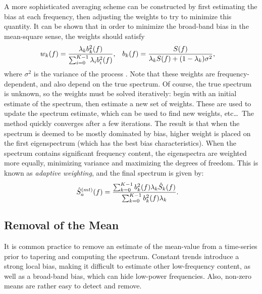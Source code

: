 A more sophisticated averaging scheme can be constructed by first estimating the bias at each frequency, then adjusting the weights to try to minimize this quantity.  It can be shown that in order to minimize the broad-band bias in the mean-square sense, the weights should satisfy
\begin{align}
    w_k(f) & = \dfrac{\lambda_k b_k^2(f)}{\sum_{i=0}^{K-1}\lambda_ib_i^2(f)}, & b_k(f) &= \dfrac{S(f)}{\lambda_kS(f)+(1-\lambda_k)\sigma^2},  \index{adaptive weights} \label{eq:adaptweights}
\end{align}
where $\sigma^2$ is the variance of the process \cite{percival:multitaper}.  Note that these weights are frequency-dependent, and also depend on the true spectrum.  Of course, the true spectrum is unknown, so the weights must be solved iteratively: begin with an initial estimate of the spectrum, then estimate a new set of weights.  These are used to update the spectrum estimate, which can be used to find new weights, etc\ldots\ The method quickly converges after a few iterations.  The result is that when the spectrum is deemed to be mostly dominated by bias, higher weight is placed on the first eigenspectrum (which has the best bias characteristics).  When the spectrum contains significant frequency content, the eigenspectra are weighted more equally, minimizing variance and maximizing the degrees of freedom.  This is known as \emph{adaptive weighting}, and the final spectrum is given by:
\begin{align}
    \hat{S}_a^{(mt)}(f) & = \dfrac{\sum_{k=0}^{K-1} b_k^2(f)\lambda_k \hat{S}_k(f)}{\sum_{k=0}^{K-1} b_k^2(f)\lambda_k}. \label{eq:adaptspec} \index{multitaper spectral estimator!adaptive weighting}
\end{align}

\subsection{Removal of the Mean \label{sec:removemean}}

It is common practice to remove an estimate of the mean-value from a time-series prior to tapering and computing the spectrum.  Constant trends introduce a strong local bias, making it difficult to estimate other low-frequency content, as well as a broad-band bias, which can hide low-power frequencies.  Also, non-zero means are rather easy to detect and remove.

